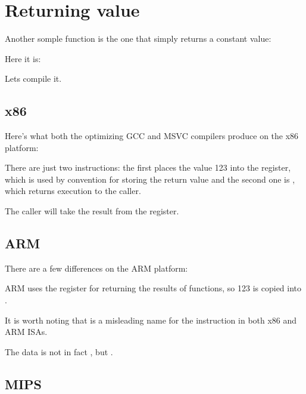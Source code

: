 \section{Returning value}
\label{ret_val_func}

Another somple function is the one that simply returns a constant value:

Here it is:



Lets compile it.

\subsection{x86}

Here's what both the optimizing GCC and MSVC compilers produce on the x86 platform:



There are just two instructions: the first places the value 123 into the \EAX register, 
which is used by convention for storing the return
value and the second one is \RET, which returns execution to the \gls{caller}.

The caller will take the result from the \EAX register.

\subsection{ARM}

There are a few differences on the ARM platform:



ARM uses the register  for returning the results of functions, so 123 is copied into .

It is worth noting that \MOV is a misleading name for the instruction in both x86 and ARM \ac{ISA}s.

The data is not in fact , but .

\subsection{MIPS}

\label{MIPS_leaf_function_ex1}

